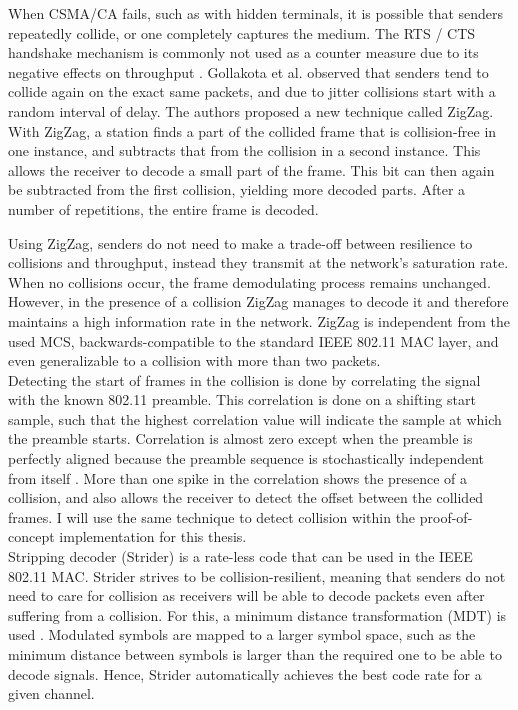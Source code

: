 When \gls{CSMA/CA} fails, such as with hidden terminals, it is possible that senders repeatedly collide, or one completely captures the medium. The \gls{RTS} / \gls{CTS} handshake mechanism is commonly not used as a counter measure due to its negative effects on throughput \cite{bianchi2000, gollakota2008, choi2013}. Gollakota et al. observed that senders tend to collide again on the exact same packets, and due to jitter collisions start with a random interval of delay. The authors proposed a new technique called ZigZag. With ZigZag, a station finds a part of the collided frame that is collision-free in one instance, and subtracts that from the collision in a second instance. This allows the receiver to decode a small part of the frame. This bit can then again be subtracted from the first collision, yielding more decoded parts. After a number of repetitions, the entire frame is decoded.

Using ZigZag, senders do not need to make a trade-off between resilience to collisions and throughput, instead they transmit at the network's saturation rate. When no collisions occur, the frame demodulating process remains unchanged. However, in the presence of a collision ZigZag manages to decode it and therefore maintains a high information rate in the network. ZigZag is independent from the used \gls{MCS}, backwards-compatible to the standard IEEE 802.11 \gls{MAC} layer, and even generalizable to a collision with more than two packets.\\

Detecting the start of frames in the collision is done by correlating the signal with the known 802.11 preamble. This correlation is done on a shifting start sample, such that the highest correlation value will indicate the sample at which the preamble starts. Correlation is almost zero except when the preamble is perfectly aligned because the preamble sequence is stochastically independent from itself \cite{ieee2012}. More than one spike in the correlation shows the presence of a collision, and also allows the receiver to detect the offset between the collided frames. I will use the same technique to detect collision within the proof-of-concept implementation for this thesis.\\

Stripping decoder (Strider) \cite{gudipati2011} is a rate-less code that can be used in the IEEE 802.11 \gls{MAC}. Strider strives to be collision-resilient, meaning that senders do not need to care for collision as receivers will be able to decode packets even after suffering from a collision. For this, a minimum distance transformation (MDT) is used \cite{gudipati2011}. Modulated symbols are mapped to a larger symbol space, such as the minimum distance between symbols is larger than the required one to be able to decode signals. Hence, Strider automatically achieves the best code rate for a given channel.

